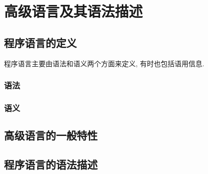 \chapter{高级语言及其语法描述}

\section{程序语言的定义}

    程序语言主要由\textsf{语法}和\textsf{语义}两个方面来定义, 有时也包括\textsf{语用}信息.

    \subsection{语法}

        

    \subsection{语义}

\section{高级语言的一般特性}

\section{程序语言的语法描述}
